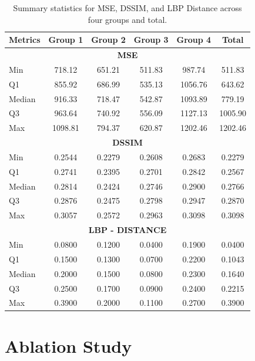\documentclass{ieeeaccess}
\begin{document}
\begin{table}[htbp]
    \centering
    \caption{Summary statistics for MSE, DSSIM, and LBP Distance across four groups and total.}
    \label{tab:metricsSummary}
    \begin{tabular*}{\linewidth}{@{\extracolsep{\fill}}lccccc}
        \textbf{Metrics}
        & \textbf{Group 1} & \textbf{Group 2} & \textbf{Group 3} & \textbf{Group 4} & \textbf{Total} \\
		\midrule
		\multicolumn{6}{c}{\textbf{MSE}} \\
		\midrule
		Min    & 718.12  & 651.21 & 511.83 & 987.74  & 511.83 \\
		Q1     & 855.92  & 686.99 & 535.13 & 1056.76 & 643.62 \\
		Median & 916.33  & 718.47 & 542.87 & 1093.89 & 779.19 \\
		Q3     & 963.64  & 740.92 & 556.09 & 1127.13 & 1005.90 \\
		Max    & 1098.81 & 794.37 & 620.87 & 1202.46 & 1202.46 \\
		\midrule
		\multicolumn{6}{c}{\textbf{DSSIM}} \\
		\midrule
		Min    & 0.2544 & 0.2279 & 0.2608 & 0.2683 & 0.2279 \\
		Q1     & 0.2741 & 0.2395 & 0.2701 & 0.2842 & 0.2567 \\
		Median & 0.2814 & 0.2424 & 0.2746 & 0.2900 & 0.2766 \\
		Q3     & 0.2876 & 0.2475 & 0.2798 & 0.2947 & 0.2870 \\
		Max    & 0.3057 & 0.2572 & 0.2963 & 0.3098 & 0.3098 \\
		\midrule
		\multicolumn{6}{c}{\textbf{LBP - DISTANCE}} \\
		\midrule
		Min    & 0.0800 & 0.1200 & 0.0400 & 0.1900 & 0.0400 \\
		Q1     & 0.1500 & 0.1300 & 0.0700 & 0.2200 & 0.1043 \\
		Median & 0.2000 & 0.1500 & 0.0800 & 0.2300 & 0.1640 \\
		Q3     & 0.2500 & 0.1700 & 0.0900 & 0.2400 & 0.2215 \\
		Max    & 0.3900 & 0.2000 & 0.1100 & 0.2700 & 0.3900 \\
		\bottomrule
	\end{tabular*}
\end{table}
\section{Ablation Study}
\label{sec:ablation}
\end{document}
